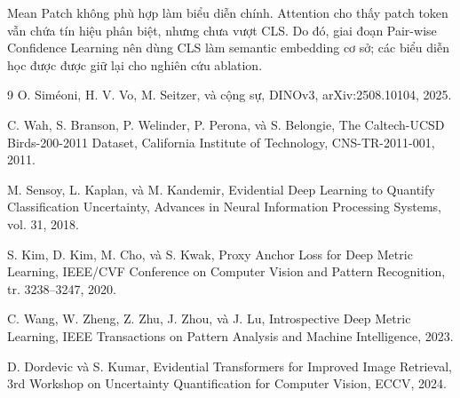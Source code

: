 \documentclass[11pt,a4paper]{article}
\begin{document}
Mean Patch không phù hợp làm biểu diễn chính. Attention cho thấy patch token vẫn chứa tín hiệu phân biệt, nhưng chưa vượt CLS. Do đó, giai đoạn Pair-wise Confidence Learning nên dùng CLS làm semantic embedding cơ sở; các biểu diễn học được được giữ lại cho nghiên cứu ablation.

\begin{thebibliography}{9}
O. Siméoni, H. V. Vo, M. Seitzer, và cộng sự,
DINOv3, arXiv:2508.10104, 2025.

C. Wah, S. Branson, P. Welinder, P. Perona, và S. Belongie,
The Caltech-UCSD Birds-200-2011 Dataset,
California Institute of Technology, CNS-TR-2011-001, 2011.

M. Sensoy, L. Kaplan, và M. Kandemir,
Evidential Deep Learning to Quantify Classification Uncertainty,
Advances in Neural Information Processing Systems, vol. 31, 2018.

S. Kim, D. Kim, M. Cho, và S. Kwak,
Proxy Anchor Loss for Deep Metric Learning,
IEEE/CVF Conference on Computer Vision and Pattern Recognition, tr. 3238--3247, 2020.

C. Wang, W. Zheng, Z. Zhu, J. Zhou, và J. Lu,
Introspective Deep Metric Learning,
IEEE Transactions on Pattern Analysis and Machine Intelligence, 2023.

D. Dordevic và S. Kumar,
Evidential Transformers for Improved Image Retrieval,
3rd Workshop on Uncertainty Quantification for Computer Vision, ECCV, 2024.
\end{thebibliography}
\end{document}
